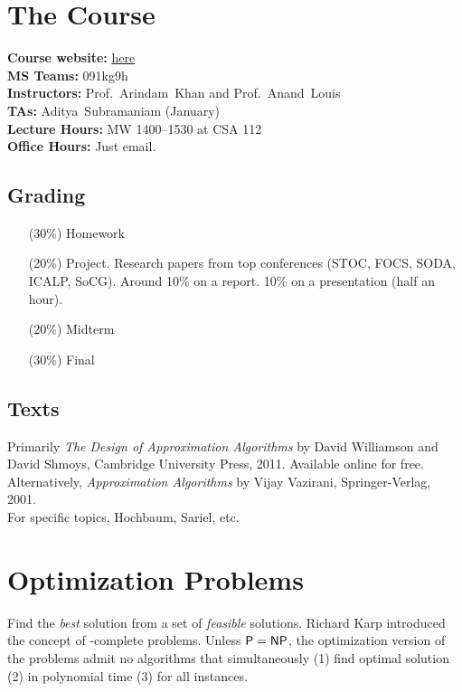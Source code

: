 
\setcounter{section}{-1}
\section{The Course} \label{sec:course}
\textbf{Course website:} \href{https://www.csa.iisc.ac.in/~arindamkhan/courses/ApproxAlgo22/ApproxAlgo.html}{here} \\
\textbf{MS Teams:} 091kg9h \\
\textbf{Instructors:} Prof.~Arindam~Khan and Prof.~Anand~Louis \\
\textbf{TAs:} Aditya~Subramaniam (January) \\
\textbf{Lecture Hours:} MW 1400--1530 at CSA 112 \\
\textbf{Office Hours:} Just email.

\subsection{Grading} \label{sec:grading}
\begin{itemize}
    \item[(30\%)] Homework
    \item[(20\%)] Project. Research papers from top conferences
        (STOC, FOCS, SODA, ICALP, SoCG).
        Around 10\% on a report.
        10\% on a presentation (half an hour).
    \item[(20\%)] Midterm
    \item[(30\%)] Final
\end{itemize}

\subsection{Texts} \label{sec:texts}
Primarily \textit{The Design of Approximation Algorithms} by David Williamson
and David Shmoys, Cambridge University Press, 2011.
Available online for free. \\
Alternatively, \textit{Approximation Algorithms} by Vijay Vazirani, Springer-Verlag, 2001. \\
For specific topics, Hochbaum, Sariel, etc.

\section{Optimization Problems} \label{sec:optimization_problems}
Find the \emph{best} solution from a set of \emph{feasible} solutions.
Richard Karp introduced the concept of \NP-complete problems.
Unless $\mathsf{P} = \mathsf{NP}$, the optimization version of the problems admit no algorithms
that simultaneously (1) find optimal solution (2) in polynomial time (3) for
all instances.

